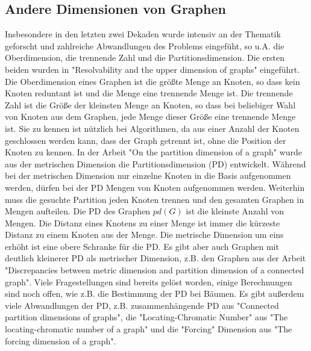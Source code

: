 \subsection{Andere Dimensionen von Graphen}
\vspace{-2mm}
Insbesondere in den letzten zwei Dekaden wurde intensiv an der Thematik geforscht und zahlreiche Abwandlungen des Problems eingefüht, so u.A. die Oberdimension, die trennende Zahl und die Partitionsdimension.\newline
Die ersten beiden wurden in "Resolvability and the upper dimension of graphs" \cite{reso} eingeführt. Die Oberdimension eines Graphen ist die größte Menge an Knoten, so dass kein Knoten reduntant ist und die Menge eine trennende Menge ist. Die trennende Zahl ist die Größe der kleinsten Menge an Knoten, so dass bei beliebiger Wahl von Knoten aus dem Graphen, jede Menge dieser Größe eine trennende Menge ist. Sie zu kennen ist nützlich bei Algorithmen, da aus einer Anzahl der Knoten geschlossen werden kann, dass der Graph getrennt ist, ohne die Position der Knoten zu kennen.
\vspace{-1.5mm}\newline\newline 
In der Arbeit "On the partition dimension of a graph" \cite{partit} wurde aus der metrischen Dimension die Partitionsdimension (PD) entwickelt. Während bei der metrischen Dimension nur einzelne Knoten in die Basis aufgenommen werden, dürfen bei der PD Mengen von Knoten aufgenommen werden. Weiterhin muss die gesuchte Partition jeden Knoten trennen und den gesamten Graphen in Mengen aufteilen. Die PD des Graphen $pd(G)$ ist die kleinste Anzahl von Mengen. Die Distanz eines Knotens zu einer Menge ist immer die kürzeste Distanz zu einem Knoten aus der Menge.\newline
Die metrische Dimension um eins erhöht ist eine obere Schranke für die PD\cite{partit}. Es gibt aber auch Graphen mit deutlich kleinerer PD als metrischer Dimension, z.B. den Graphen aus der Arbeit "Discrepancies between metric dimension and partition dimension of a connected graph"\cite{disc}. Viele Fragestellungen sind bereits gelöst worden, einige Berechnungen sind noch offen, wie z.B. die Bestimmung der PD bei Bäumen. Es gibt außerdem viele Abwandlungen der PD, z.B. zusammenhängende PD aus "Connected partition dimensions of graphs"\cite{con}, die "Locating-Chromatic Number" aus "The locating-chromatic number of a graph"\cite{loc} und die "Forcing" Dimension aus "The forcing dimension of a graph"\cite{forcing}.
\vspace{-4mm}
